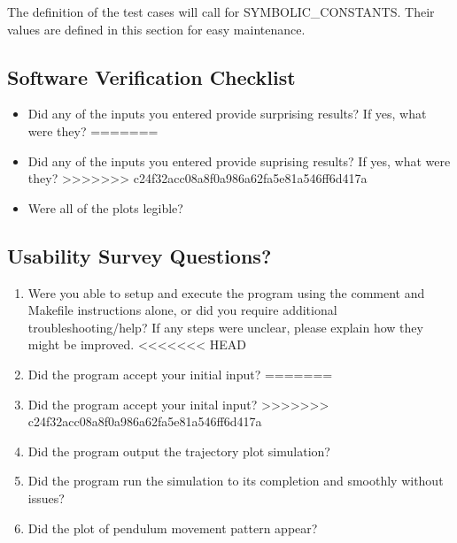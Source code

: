 \documentclass[12pt, titlepage]{article}
\begin{document}
{The definition of the test cases will call for SYMBOLIC\_CONSTANTS.
Their values are defined in this section for easy maintenance.

\subsection{Software Verification Checklist} 
\label{softwarevercheck}
\begin{itemize}
<<<<<<< HEAD
	\item Did any of the inputs you entered provide surprising results? 
	If yes, what were they?
=======
	\item Did any of the inputs you entered provide suprising  results? If yes, 
	what were they?
>>>>>>> c24f32acc08a8f0a986a62fa5e81a546ff6d417a
	\item Were all of the plots legible? 
\end{itemize} 

\subsection{Usability Survey Questions?}
\begin{enumerate}
	\item Were you able to setup and execute the program using the comment
	and Makefile instructions alone, or did you require additional 
	troubleshooting/help? 
	If any steps were unclear, please explain how they might be improved.
<<<<<<< HEAD
	\item Did the program accept your initial input?
=======
	\item Did the program accept your inital  input?
>>>>>>> c24f32acc08a8f0a986a62fa5e81a546ff6d417a
	\item Did the program output the trajectory plot simulation?
	\item Did the program run the simulation to its completion and 
	smoothly without issues?
	\item Did the plot of pendulum movement pattern appear?
\end{enumerate}

}
\end{document}

